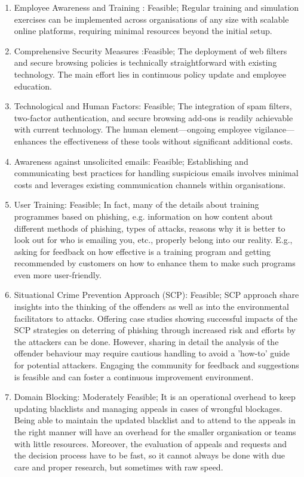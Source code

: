 \begin{enumerate}
    \item Employee Awareness and Training : Feasible; Regular training and simulation exercises can be implemented across organisations of any size with scalable online platforms, requiring minimal resources beyond the initial setup.
    \item Comprehensive Security Measures :Feasible; The deployment of web filters and secure browsing policies is technically straightforward with existing technology. The main effort lies in continuous policy update and employee education.
    \item Technological and Human Factors: Feasible; The integration of spam filters, two-factor authentication, and secure browsing add-ons is readily achievable with current technology. The human element—ongoing employee vigilance—enhances the effectiveness of these tools without significant additional costs.
    \item Awareness against unsolicited emails: Feasible; Establishing and communicating best practices for handling suspicious emails involves minimal costs and leverages existing communication channels within organisations.

     \item User Training: Feasible; In fact, many of the details about training programmes based on phishing, e.g. information on how content about different methods of phishing, types of attacks, reasons why it is better to look out for who is emailing you, etc., properly belong into our reality. E.g., asking for feedback on how effective is a training program and getting recommended by customers on how to enhance them to make such programs even more user-friendly. 
     
     \item Situational Crime Prevention Approach (SCP): Feasible;  SCP approach share insights into the thinking of the offenders as well as into the environmental facilitators to attacks. Offering case studies showing successful impacts of the SCP strategies on deterring of phishing through increased risk and efforts by the attackers can be done. However, sharing in detail the analysis of the offender behaviour may require cautious handling to avoid a 'how-to' guide for potential attackers. Engaging the community for feedback and suggestions is feasible and can foster a continuous improvement environment.
     
     \item Domain Blocking: Moderately Feasible; It is an operational overhead to keep updating blacklists and managing appeals in cases of wrongful blockages. Being able to maintain the updated blacklist and to attend to the appeals in the right manner will have an overhead for the smaller organisation or teams with little resources. Moreover, the evaluation of appeals and requests and the decision process have to be fast, so it cannot always be done with due care and proper research, but sometimes with raw speed.
     

\end{enumerate}
